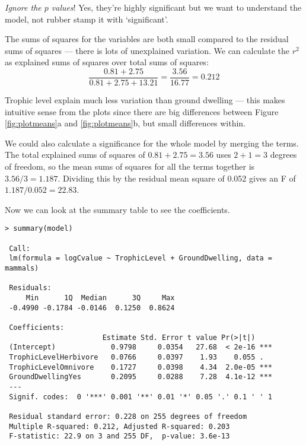 {\it Ignore the $p$ values}! Yes, they're highly significant but we 
want to understand the model, not rubber stamp it with `significant'.

\begin{compactitem}

 \item The sums of squares for the variables are both small compared to 
 the residual sums of squares --- there is lots of unexplained 
 variation. We can calculate the $r^2$ as explained sums of squares 
 over total sums of squares:
\[\frac{0.81 + 2.75}{0.81 + 2.75 + 13.21} = \frac{3.56}{16.77} = 0.212\]
 
\item Trophic level explain much less variation than ground dwelling 
--- this makes intuitive sense from the plots since there are big 
differences between Figure \ref{fig:plotmeans}a and 
\ref{fig:plotmeans}b, but small differences within.

\item We could also calculate a significance for the whole model by 
merging the terms. The total explained sums of squares of $0.81 + 2.75 
=3.56$ uses $2+1 =3$ degrees of freedom, so the mean sums of squares 
for all the terms together is $3.56/3=1.187$. Dividing this by the 
residual mean square of 0.052 gives an F of $1.187 / 0.052 = 22.83$.

\end{compactitem}

Now we can look at the summary table to see the coefficients. 

\begin{lstlisting}
> summary(model) 

 Call:
 lm(formula = logCvalue ~ TrophicLevel + GroundDwelling, data = mammals)
 
 Residuals:
     Min      1Q  Median      3Q     Max 
 -0.4990 -0.1784 -0.0146  0.1250  0.8624 
 
 Coefficients:
                       Estimate Std. Error t value Pr(>|t|)    
 (Intercept)             0.9798     0.0354   27.68  < 2e-16 ***
 TrophicLevelHerbivore   0.0766     0.0397    1.93    0.055 .  
 TrophicLevelOmnivore    0.1727     0.0398    4.34  2.0e-05 ***
 GroundDwellingYes       0.2095     0.0288    7.28  4.1e-12 ***
 ---
 Signif. codes:  0 '***' 0.001 '**' 0.01 '*' 0.05 '.' 0.1 ' ' 1 
 
 Residual standard error: 0.228 on 255 degrees of freedom
 Multiple R-squared: 0.212,	Adjusted R-squared: 0.203 
 F-statistic: 22.9 on 3 and 255 DF,  p-value: 3.6e-13 
 
\end{lstlisting}

